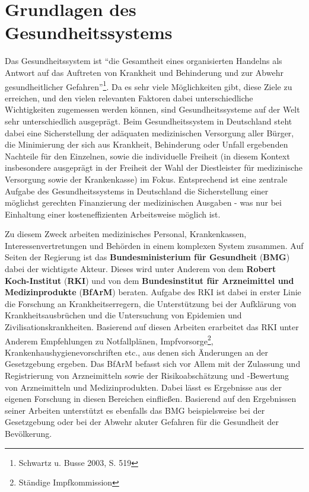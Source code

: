\section{Grundlagen des Gesundheitssystems}

Das Gesundheitssystem ist ``die Gesamtheit eines organisierten Handelns als Antwort auf das Auftreten von Krankheit und Behinderung und zur Abwehr gesundheitlicher Gefahren''\footnote{Schwartz u. Busse 2003, S. 519}. Da es sehr viele Möglichkeiten gibt, diese Ziele zu erreichen, und den vielen relevanten Faktoren dabei unterschiedliche Wichtigkeiten zugemessen werden können, sind Gesundheitssysteme auf der Welt sehr unterschiedlich ausgeprägt. Beim Gesundheitssystem in Deutschland steht dabei eine Sicherstellung der adäquaten medizinischen Versorgung aller Bürger, die Minimierung der sich aus Krankheit, Behinderung oder Unfall ergebenden Nachteile für den Einzelnen, sowie die individuelle Freiheit (in diesem Kontext insbesondere ausgeprägt in der Freiheit der Wahl der Diestleister für medizinische Versorgung sowie der Krankenkasse) im Fokus. Entsprechend ist eine zentrale Aufgabe des Gesundheitssystems in Deutschland die Sicherstellung einer möglichst gerechten Finanzierung der medizinischen Ausgaben - was nur bei Einhaltung einer kosteneffizienten Arbeitsweise möglich ist.

Zu diesem Zweck arbeiten medizinisches Personal, Krankenkassen, Interessenvertretungen und Behörden in einem komplexen System zusammen. Auf Seiten der Regierung ist das \textbf{Bundesministerium für Gesundheit} (\textbf{BMG}) dabei der wichtigste Akteur. Dieses wird unter Anderem von dem \textbf{Robert Koch-Institut} (\textbf{RKI}) und von dem \textbf{Bundesinstitut für Arzneimittel und Medizinprodukte} (\textbf{BfArM}) beraten. Aufgabe des RKI ist dabei in erster Linie die Forschung an Krankheitserregern, die Unterstützung bei der Aufklärung von Krankheitsausbrüchen und die Untersuchung von Epidemien und Zivilisationskrankheiten. Basierend auf diesen Arbeiten erarbeitet das RKI unter Anderem Empfehlungen zu Notfallplänen, Impfvorsorge\footnote{Ständige Impfkommission}, Krankenhaushygienevorschriften etc., aus denen sich Änderungen an der Gesetzgebung ergeben. Das BfArM befasst sich vor Allem mit der Zulassung und Registrierung von Arzneimitteln sowie der Risikoabschätzung und -Bewertung von Arzneimitteln und Medizinprodukten. Dabei lässt es Ergebnisse aus der eigenen Forschung in diesen Bereichen einfließen. Basierend auf den Ergebnissen seiner Arbeiten unterstützt es ebenfalls das BMG beispielsweise bei der Gesetzgebung oder bei der Abwehr akuter Gefahren für die Gesundheit der Bevölkerung. 

